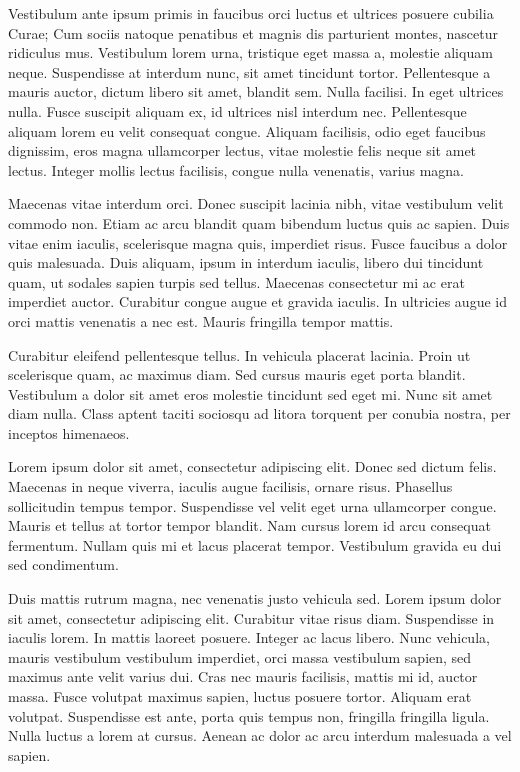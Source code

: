 Vestibulum ante ipsum primis in faucibus orci luctus et ultrices posuere cubilia Curae; Cum sociis natoque penatibus et magnis dis parturient montes, nascetur ridiculus mus. Vestibulum lorem urna, tristique eget massa a, molestie aliquam neque. Suspendisse at interdum nunc, sit amet tincidunt tortor. Pellentesque a mauris auctor, dictum libero sit amet, blandit sem. Nulla facilisi. In eget ultrices nulla. Fusce suscipit aliquam ex, id ultrices nisl interdum nec. Pellentesque aliquam lorem eu velit consequat congue. Aliquam facilisis, odio eget faucibus dignissim, eros magna ullamcorper lectus, vitae molestie felis neque sit amet lectus. Integer mollis lectus facilisis, congue nulla venenatis, varius magna.

Maecenas vitae interdum orci. Donec suscipit lacinia nibh, vitae vestibulum velit commodo non. Etiam ac arcu blandit quam bibendum luctus quis ac sapien. Duis vitae enim iaculis, scelerisque magna quis, imperdiet risus. Fusce faucibus a dolor quis malesuada. Duis aliquam, ipsum in interdum iaculis, libero dui tincidunt quam, ut sodales sapien turpis sed tellus. Maecenas consectetur mi ac erat imperdiet auctor. Curabitur congue augue et gravida iaculis. In ultricies augue id orci mattis venenatis a nec est. Mauris fringilla tempor mattis.

Curabitur eleifend pellentesque tellus. In vehicula placerat lacinia. Proin ut scelerisque quam, ac maximus diam. Sed cursus mauris eget porta blandit. Vestibulum a dolor sit amet eros molestie tincidunt sed eget mi. Nunc sit amet diam nulla. Class aptent taciti sociosqu ad litora torquent per conubia nostra, per inceptos himenaeos. 	


Lorem ipsum dolor sit amet, consectetur adipiscing elit. Donec sed dictum felis. Maecenas in neque viverra, iaculis augue facilisis, ornare risus. Phasellus sollicitudin tempus tempor. Suspendisse vel velit eget urna ullamcorper congue. Mauris et tellus at tortor tempor blandit. Nam cursus lorem id arcu consequat fermentum. Nullam quis mi et lacus placerat tempor. Vestibulum gravida eu dui sed condimentum.

Duis mattis rutrum magna, nec venenatis justo vehicula sed. Lorem ipsum dolor sit amet, consectetur adipiscing elit. Curabitur vitae risus diam. Suspendisse in iaculis lorem. In mattis laoreet posuere. Integer ac lacus libero. Nunc vehicula, mauris vestibulum vestibulum imperdiet, orci massa vestibulum sapien, sed maximus ante velit varius dui. Cras nec mauris facilisis, mattis mi id, auctor massa. Fusce volutpat maximus sapien, luctus posuere tortor. Aliquam erat volutpat. Suspendisse est ante, porta quis tempus non, fringilla fringilla ligula. Nulla luctus a lorem at cursus. Aenean ac dolor ac arcu interdum malesuada a vel sapien.

